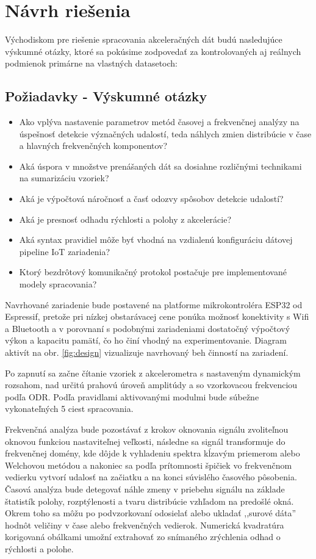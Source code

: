 \chapter{Návrh riešenia}
Východiskom pre riešenie spracovania akceleračných dát budú nasledujúce výskumné otázky, ktoré
sa pokúsime zodpovedať za kontrolovaných aj reálnych podmienok primárne na vlastných datasetoch:

\section{Požiadavky - Výskumné otázky}
\begin{itemize}[noitemsep]
	\item Ako vplýva nastavenie parametrov metód časovej a frekvenčnej analýzy na úspešnosť detekcie význačných udalostí,
	teda náhlych zmien distribúcie v čase a hlavných frekvenčných komponentov?
	\item Aká úspora v množstve prenášaných dát sa dosiahne rozličnými technikami na sumarizáciu vzoriek?
	\item Aká je výpočtová náročnosť a časť odozvy spôsobov detekcie udalostí?
	\item Aká je presnosť odhadu rýchlosti a polohy z akcelerácie?
	\item Aká syntax pravidiel môže byť vhodná na vzdialenú konfiguráciu dátovej pipeline IoT zariadenia?
	\item Ktorý bezdrôtový komunikačný protokol postačuje pre implementované modely spracovania?
\end{itemize}

Navrhované zariadenie bude postavené na platforme mikrokontroléra ESP32 od Espressif, pretože pri nízkej
obstarávacej cene ponúka možnosť konektivity s Wifi a Bluetooth a v porovnaní s podobnými zariadeniami dostatočný
výpočtový výkon a kapacitu pamätí, čo ho činí vhodný na experimentovanie. Diagram aktivít na obr. \ref{fig:design}
vizualizuje navrhovaný beh činností na zariadení.

Po zapnutí sa začne čítanie vzoriek z akcelerometra s nastaveným dynamickým rozsahom, nad určitú
prahovú úroveň amplitúdy a so vzorkovacou frekvenciou podľa ODR. Podľa pravidlami aktivovanými modulmi bude
súbežne vykonateľných 5 ciest spracovania.

Frekvenčná analýza bude pozostávať z krokov oknovania signálu  zvoliteľnou oknovou funkciou nastaviteľnej veľkosti,
následne sa signál transformuje do frekvenčnej domény,
kde dôjde k vyhladeniu spektra kĺzavým priemerom alebo Welchovou metódou a nakoniec sa podľa prítomnosti špičiek
vo frekvenčnom vedierku vytvorí udalosť na začiatku a na konci súvislého časového pôsobenia. Časová analýza
bude detegovať náhle zmeny v priebehu signálu na základe štatistík polohy, rozptýlenosti a tvaru
distribúcie vzhľadom na predošlé okná. Okrem toho sa môžu po podvzorkovaní odosielať alebo ukladať ,,surové dáta''
hodnôt veličiny v čase alebo frekvenčných vedierok. Numerická kvadratúra korigovaná obálkami umožní extrahovať zo
snímaného zrýchlenia odhad o rýchlosti a polohe.

